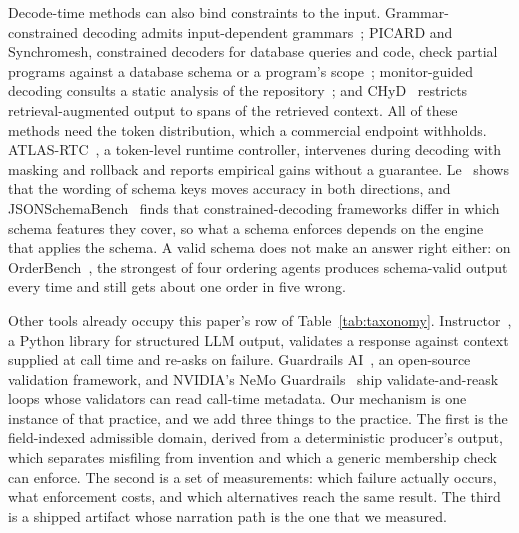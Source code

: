 \documentclass[journal]{IEEEtran}
\begin{document}
Decode-time methods can also bind constraints to the input.
Grammar-constrained decoding admits input-dependent grammars~\cite{gcd}; PICARD and Synchromesh, constrained decoders for database queries and code, check partial
programs against a database schema or a program's
scope~\cite{scholak2021picard,poesia2022synchromesh}; monitor-guided decoding
consults a static analysis of the repository~\cite{agrawal2023mgd}; and
CHyD~\cite{signe2026chyd} restricts retrieval-augmented output to spans of the
retrieved context. All of these methods need the token distribution, which a
commercial endpoint withholds. ATLAS-RTC~\cite{cruz2026atlasrtc}, a
token-level runtime controller, intervenes during decoding with masking and
rollback and reports empirical gains without a guarantee. Le~\cite{le2026schemakey} shows that the
wording of schema keys moves accuracy in both directions, and
JSONSchemaBench~\cite{geng2025jsonschemabench} finds that constrained-decoding
frameworks differ in which schema features they cover, so what a schema
enforces depends on the engine that applies the schema. A valid schema does not
make an answer right either: on OrderBench~\cite{li2026orderbench}, the
strongest of four ordering agents produces schema-valid output every time and
still gets about one order in five wrong.

Other tools already occupy this paper's row of Table~\ref{tab:taxonomy}.
Instructor~\cite{liu2023instructor}, a Python library for structured LLM
output, validates a response against context supplied at call time and re-asks
on failure. Guardrails AI~\cite{guardrailsai}, an open-source validation
framework, and NVIDIA's NeMo Guardrails~\cite{nemo} ship validate-and-reask
loops whose validators can read call-time metadata. Our mechanism is one
instance of that practice, and we add three things to the practice. The first
is the field-indexed admissible domain, derived from a deterministic
producer's output, which separates misfiling from invention and which a
generic membership check can enforce. The second is a set of measurements:
which failure actually occurs, what enforcement costs, and which alternatives
reach the same result. The third is a shipped artifact whose narration path is
the one that we measured.
\end{document}
